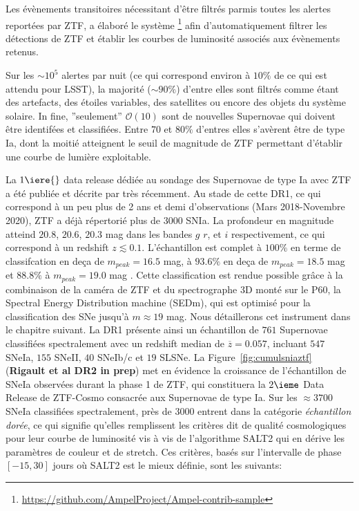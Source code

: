 \documentclass[../main/main.tex]{subfiles}
\begin{document}
Les évènements transitoires nécessitant d'être filtrés parmis toutes les
alertes reportées par ZTF, \citet{NordinAMPEL2019} a élaboré le système
\footnote{\url{https://github.com/AmpelProject/Ampel-contrib-sample}} afin d'automatiquement filtrer
les détections de ZTF et établir les courbes de luminosité associés aux
évènements retenus.

Sur les $\sim 10^{5}$ alertes par nuit (ce qui correspond environ à
$10\%$ de ce qui est attendu pour LSST), la majorité ($\sim 90\%$)
d'entre elles sont filtrés comme étant des artefacts, des étoiles
variables, des satellites ou encore des objets du système solaire. In
fine, ''seulement'' $\mathcal{O}(10)$ sont de nouvelles Supernovae qui
doivent être identifées et classifiées. Entre $70$ et $80\%$ d'entres
elles s'avèrent être de type Ia, dont la moitié atteignent le seuil de
magnitude de ZTF permettant d'établir une courbe de lumière
exploitable.

La $1\iere{}$ data release dédiée au sondage des Supernovae de type Ia
avec ZTF a été publiée et décrite par \citet{DhawanZTFDR1} très
récemment. Au stade de cette DR1, ce qui correspond à un peu plus de 2
ans et demi d'observations (Mars 2018-Novembre 2020), ZTF a déjà
répertorié plus de $3000$ SNIa. La profondeur en magnitude atteind
$20.8$, $20.6$, $20.3$ mag dans les bandes $g$ $r$, et $i$ respectivement, ce qui
correspond à un redshift $z\lesssim0.1$. L'échantillon est complet à
$100\%$ en terme de classifcation en deça de $m_{peak}=16.5$ mag, à
$93.6\%$ en deça de $m_{peak}=18.5$ mag et $88.8\%$ à $m_{peak}=19.0$
mag \citep{FremlingZTFspec2020}.
Cette classification est rendue possible grâce à la combinaison de la
caméra de ZTF et du spectrographe 3D monté sur le P60, la Spectral
Energy Distribution machine (SEDm), qui est optimisé pour la
classification des SNe jusqu'à $m\approx19$ mag. Nous détaillerons cet instrument
dans le chapitre suivant. La DR1
présente ainsi un échantillon de $761$ Supernovae classifiées
spectralement avec un redshift median de $\overbar{z}=0.057$, incluant $547$ SNeIa, $155$ SNeII, $40$ SNeIb/c et $19$ SLSNe.
La Figure~\ref{fig:cumulsniaztf} (\textbf{Rigault et al DR2 in prep}) met en évidence la croissance de
l'échantillon de SNeIa observées durant la phase 1 de ZTF, qui
constituera la $2\ieme$ Data Release de ZTF-Cosmo consacrée aux Supernovae de
type Ia. Sur les $\approx3700$ SNeIa classifiées spectralement, près de
$3000$ entrent dans la catégorie \textit{échantillon dorée}, ce qui
signifie qu'elles remplissent les critères dit de qualité cosmologiques
pour leur courbe de luminosité vis à vis de l'algorithme SALT2 qui en
dérive les paramètres de couleur et de stretch. Ces
critères, basés sur l'intervalle de phase $[-15,30]$ jours où SALT2 est
le mieux définie, sont les suivants:
\end{document}
